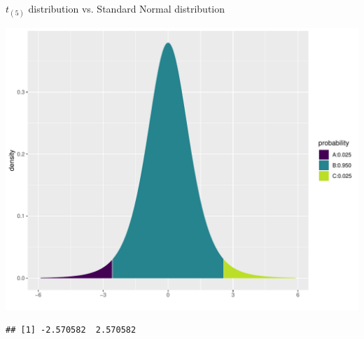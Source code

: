 \documentclass{beamer}\usepackage[]{graphicx}\usepackage[]{color}
\newenvironment{knitrout}{}{} %
\begin{document}
\begin{frame}[fragile]{$t_{(5)}$ distribution vs. Standard Normal distribution}
\begin{minipage}{0.5\textwidth}
\begin{knitrout}
{\centering \includegraphics[width=1\linewidth]{figure/unnamed-chunk-3-1} 

}


\begin{verbatim}
## [1] -2.570582  2.570582
\end{verbatim}

\end{knitrout}
\end{minipage}
\end{frame}
\end{document}
